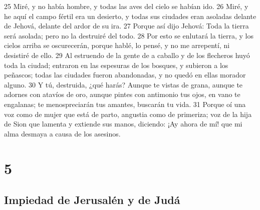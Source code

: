 25 Miré, y no había hombre, y todas las aves del cielo se habían ido.
26 Miré, y he aquí el campo fértil era un desierto, y todas sus ciudades eran asoladas delante de Jehová, delante del ardor de su ira.
27 Porque así dijo Jehová: Toda la tierra será asolada; pero no la destruiré del todo.
28 Por esto se enlutará la tierra, y los cielos arriba se oscurecerán, porque hablé, lo pensé, y no me arrepentí, ni desistiré de ello.
29 Al estruendo de la gente de a caballo y de los flecheros huyó toda la ciudad; entraron en las espesuras de los bosques, y subieron a los peñascos; todas las ciudades fueron abandonadas, y no quedó en ellas morador alguno.
30 Y tú, destruida, ¿qué harás? Aunque te vistas de grana, aunque te adornes con atavíos de oro, aunque pintes con antimonio tus ojos, en vano te engalanas; te menospreciarán tus amantes, buscarán tu vida.
31 Porque oí una voz como de mujer que está de parto, angustia como de primeriza; voz de la hija de Sion que lamenta y extiende sus manos, diciendo: ¡Ay ahora de mí! que mi alma desmaya a causa de los asesinos.

\chapter{5}

\section*{Impiedad de Jerusalén y de Judá}

